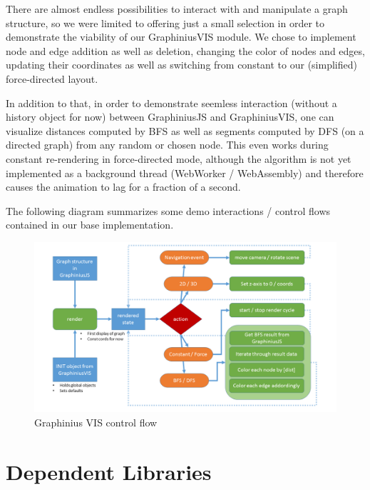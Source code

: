 	There are almost endless possibilities to interact with and manipulate a graph structure, so we were limited to offering just a small selection in order to demonstrate the viability of our GraphiniusVIS module. We chose to implement node and edge addition as well as deletion, changing the color of nodes and edges, updating their coordinates as well as switching from constant to our (simplified) force-directed layout. 
	
	In addition to that, in order to demonstrate seemless interaction (without a history object for now) between GraphiniusJS and GraphiniusVIS, one can visualize distances computed by BFS as well as segments computed by DFS (on a directed graph) from any random or chosen node. This even works during constant re-rendering in force-directed mode, although the algorithm is not yet implemented as a background thread (WebWorker / WebAssembly) and therefore causes the animation to lag for a fraction of a second.
	
	The following diagram summarizes some demo interactions / control flows contained in our base implementation.
	
		\begin{figure}[ht]
			\hspace*{-1.3cm}
			\includegraphics[width=1.2\textwidth]{figures/VIS_Control_Flow}
			\caption{Graphinius VIS control flow}
			\label{fig_vis_control_flow}
		\end{figure}


\section{Dependent Libraries}
\label{sect:dep_libraries}

